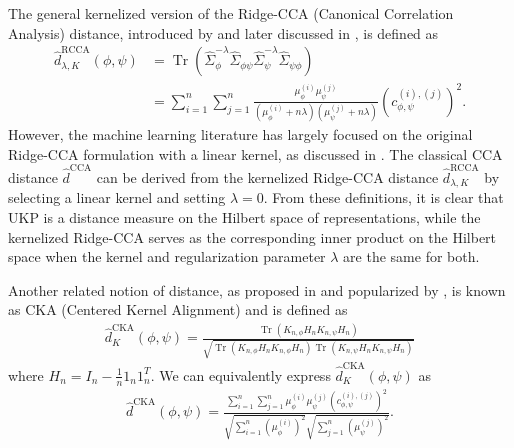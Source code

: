 \documentclass[11pt]{article}
\newcommand{\repone}{\phi}
\newcommand{\reptwo}{\psi}
\DeclareMathOperator*{\Tr}{\text{Tr}}
\newcommand{\metricstname}{UKP }
\theoremstyle{plain}
\begin{document}
The general kernelized version of the Ridge-CCA (Canonical Correlation Analysis) distance, introduced by \citet{vinod1976canonical} and later discussed in \citet{kuss2003geometry}, is defined as
\[
\begin{aligned}
 \hat{d}^{\text{RCCA}}_{\lambda,K}(\repone,\reptwo) &= \Tr\left(\hat{\Sigma}_{\repone}^{-\lambda}\hat{\Sigma}_{\repone\reptwo}\hat{\Sigma}_{\reptwo}^{-\lambda}\hat{\Sigma}_{\reptwo\repone}\right) \\
    &= \sum_{i=1}^{n}\sum_{j=1}^{n}\frac{\mu_{\repone}^{(i)}\mu_{\reptwo}^{(j)}}{\left(\mu_{\repone}^{(i)} + n\lambda\right)\left(\mu_{\reptwo}^{(j)} + n\lambda\right)}\left(c_{\repone,\reptwo}^{(i),(j)} \right)^{2}.
\end{aligned}
\]
However, the machine learning literature has largely focused on the original Ridge-CCA formulation with a linear kernel, as discussed in \citet{kornblith2019similarity}. The classical CCA distance $\hat{d}^{\text{CCA}}$ can be derived from the kernelized Ridge-CCA distance $\hat{d}^{\text{RCCA}}_{\lambda,K}$ by selecting a linear kernel and setting $\lambda=0$. From these definitions, it is clear that \metricstname is a distance measure on the Hilbert space of representations, while the kernelized Ridge-CCA serves as the corresponding inner product on the Hilbert space when the kernel and regularization parameter $\lambda$ are the same for both.

Another related notion of distance, as proposed in \citet{cristianini2001kernel} and popularized  by \citet{kornblith2019similarity}, is known as CKA (Centered Kernel Alignment) and is defined as 
\[
\begin{aligned}
    \hat{d}_{K}^{\text{CKA}}(\repone,\reptwo) = \frac{\Tr\left(K_{n,\repone}H_{n}K_{n,\reptwo}H_{n}\right)}{\sqrt{\Tr\left(K_{n,\repone}H_{n}K_{n,\repone}H_{n}\right) \Tr\left(K_{n,\reptwo}H_{n}K_{n,\reptwo}H_{n}\right)}}
\end{aligned}
\]
where $H_{n} = I_{n} - \frac{1}{n}1_{n}1_{n}^{T}$. We can equivalently express $\hat{d}_{K}^{\text{CKA}}(\repone,\reptwo) $ as 
\[
\begin{aligned}
    \hat{d}^{\text{CKA}}(\repone,\reptwo) = \frac{\sum_{i=1}^{n}\sum_{j=1}^{n}\mu_{\repone}^{(i)}\mu_{\reptwo}^{(j)}\left(c_{\repone,\reptwo}^{(i),(j)} \right)^{2}}{\sqrt{\sum_{i=1}^{n} \left(\mu_{\repone}^{(i)}\right)^{2}}\sqrt{\sum_{j=1}^{n} \left(\mu_{\reptwo}^{(j)}\right)^{2}}}.
\end{aligned}
\]
\end{document}
